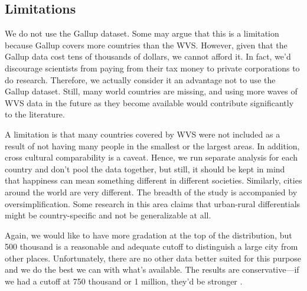 \documentclass[11pt, letterpaper]{article}
\begin{document}
\begin{spacing}{1.4} %



\subsection*{Limitations}

We do not use the Gallup dataset. Some may argue that this is a limitation because Gallup covers more countries than the WVS. However, given that the Gallup data cost tens of thousands of dollars, we cannot afford it. In fact, we'd discourage scientists from paying from their tax money to private corporations to do research. Therefore, we actually consider it an advantage not to use the Gallup dataset. Still, many world countries are missing, and using more waves of WVS data in the future as they
become available would contribute significantly to the literature. 

A limitation is that many countries covered by WVS were not included as a result of not having
many people in the smallest or the largest areas. In addition, cross cultural
comparability is a caveat. Hence, we run separate analysis for each country and
don't pool the data together, but still, it should be kept in mind that
happiness can mean something different in different societies. Similarly, cities
around the world are very different. The breadth of the study is accompanied by
oversimplification. Some research in this area claims that urban-rural differentials might be country-specific and not be generalizable at all. %

Again, we would like to have more gradation at the top of the distribution, but
500 thousand is a reasonable and adequate cutoff to distinguish a large city
from other places. Unfortunately, there are no other data better suited for this
purpose and we do the best we can with what's available. The results are
conservative---if we had a cutoff at 750 thousand or 1 million, they'd be
stronger \citep{aokCityBook15}.


\end{spacing}
\end{document}
